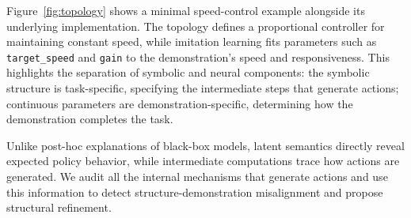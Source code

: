 Figure~\ref{fig:topology} shows a minimal speed-control example alongside its underlying implementation.
The topology defines a proportional controller for maintaining constant speed, while imitation learning fits parameters such as \texttt{target\_speed} and \texttt{gain} to the demonstration's speed and responsiveness.
This highlights the separation of symbolic and neural components: the symbolic structure is task-specific, specifying the intermediate steps that generate actions; continuous parameters are demonstration-specific, determining how the demonstration completes the task.

Unlike post-hoc explanations of black-box models, latent semantics directly reveal expected policy behavior, while intermediate computations trace how actions are generated.
We audit all the internal mechanisms that generate actions and use this information to detect structure-demonstration misalignment and propose structural refinement.